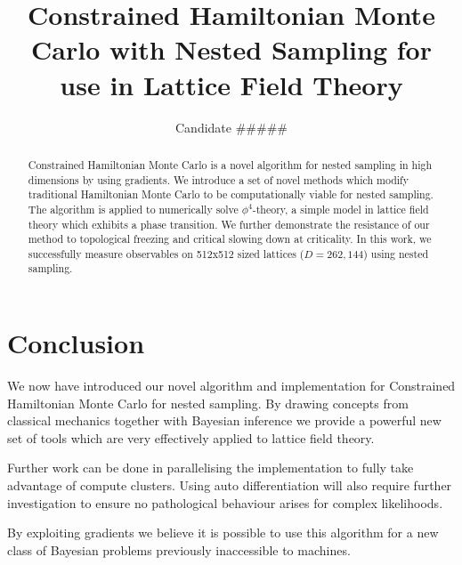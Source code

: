 \documentclass[aps,prd,reprint,preprintnumbers,showpacs,floatfix,nofootinbib,superscript address]{revtex4-2}
\begin{document}
\title{Constrained Hamiltonian Monte Carlo with Nested Sampling for use in Lattice Field Theory}

\author{Candidate \#\#\#\#\#}

\begin{abstract}
     Constrained Hamiltonian Monte Carlo is a novel algorithm for nested sampling in high dimensions by using gradients.
     We introduce a set of novel methods which modify traditional Hamiltonian Monte Carlo to be computationally viable for
     nested sampling.
     The algorithm is applied to numerically solve $\phi^4$-theory, a simple model in lattice field theory which
     exhibits a phase transition.
     We further demonstrate the resistance of our method to topological freezing and critical slowing down at criticality.
     In this work, we successfully measure observables on 512x512 sized lattices ($D=262,144$) using nested sampling.
\end{abstract}


\maketitle

















\section{Conclusion}\label{sec:conclusion}
     We now have introduced our novel algorithm and implementation for Constrained Hamiltonian Monte Carlo for nested sampling.
     By drawing concepts from classical mechanics together with Bayesian inference we provide a powerful
     new set of tools which are very effectively applied to lattice field theory.

     Further work can be done in parallelising the implementation to fully take advantage of compute clusters.
     Using auto differentiation will also require further investigation to ensure no pathological behaviour arises for
     complex likelihoods.

     By exploiting gradients we believe it is possible to use this algorithm for a new class of
     Bayesian problems previously inaccessible to machines.






\end{document}
